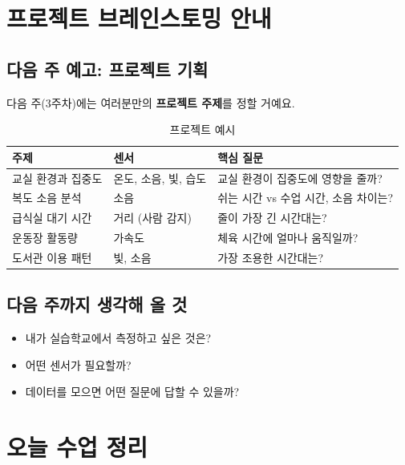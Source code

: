 \documentclass[11pt, a4paper]{article}
\begin{document}
\section{프로젝트 브레인스토밍 안내}

\subsection{다음 주 예고: 프로젝트 기획}

다음 주(3주차)에는 여러분만의 \textbf{프로젝트 주제}를 정할 거예요.

\begin{table}[H]\centering
\caption{프로젝트 예시}
\begin{tabular}{lll}\toprule
\textbf{주제} & \textbf{센서} & \textbf{핵심 질문} \\\midrule
교실 환경과 집중도 & 온도, 소음, 빛, 습도 & 교실 환경이 집중도에 영향을 줄까? \\
복도 소음 분석 & 소음 & 쉬는 시간 vs 수업 시간, 소음 차이는? \\
급식실 대기 시간 & 거리 (사람 감지) & 줄이 가장 긴 시간대는? \\
운동장 활동량 & 가속도 & 체육 시간에 얼마나 움직일까? \\
도서관 이용 패턴 & 빛, 소음 & 가장 조용한 시간대는? \\
\bottomrule
\end{tabular}
\end{table}

\subsection{다음 주까지 생각해 올 것}

\begin{itemize}[leftmargin=1.5em]
\item 내가 실습학교에서 측정하고 싶은 것은?
\item 어떤 센서가 필요할까?
\item 데이터를 모으면 어떤 질문에 답할 수 있을까?
\end{itemize}

\section{오늘 수업 정리}
\end{document}
